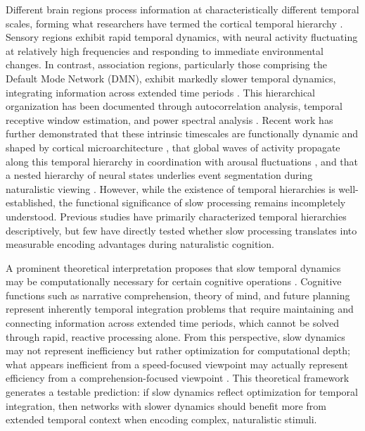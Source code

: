 \documentclass[10pt,letterpaper]{article}
\begin{document}
Different brain regions process information at characteristically different temporal scales, forming what researchers have termed the cortical temporal hierarchy \citep{murray2014hierarchy, hasson2008hierarchy}. Sensory regions exhibit rapid temporal dynamics, with neural activity fluctuating at relatively high frequencies and responding to immediate environmental changes. In contrast, association regions, particularly those comprising the Default Mode Network (DMN), exhibit markedly slower temporal dynamics, integrating information across extended time periods \citep{honey2012slow, lerner2011topographic}. This hierarchical organization has been documented through autocorrelation analysis, temporal receptive window estimation, and power spectral analysis \citep{chaudhuri2015large, gao2020neuronal}. Recent work has further demonstrated that these intrinsic timescales are functionally dynamic and shaped by cortical microarchitecture \citep{gao2020neuronal}, that global waves of activity propagate along this temporal hierarchy in coordination with arousal fluctuations \citep{raut2021global}, and that a nested hierarchy of neural states underlies event segmentation during naturalistic viewing \citep{geerligs2022nested, lugtmeijer2025temporal}. However, while the existence of temporal hierarchies is well-established, the functional significance of slow processing remains incompletely understood. Previous studies have primarily characterized temporal hierarchies descriptively, but few have directly tested whether slow processing translates into measurable encoding advantages during naturalistic cognition.

A prominent theoretical interpretation proposes that slow temporal dynamics may be computationally necessary for certain cognitive operations \citep{kiebel2008hierarchy, hasson2015hierarchical}. Cognitive functions such as narrative comprehension, theory of mind, and future planning represent inherently temporal integration problems that require maintaining and connecting information across extended time periods, which cannot be solved through rapid, reactive processing alone. From this perspective, slow dynamics may not represent inefficiency but rather optimization for computational depth; what appears inefficient from a speed-focused viewpoint may actually represent efficiency from a comprehension-focused viewpoint \citep{chen2017shared}. This theoretical framework generates a testable prediction: if slow dynamics reflect optimization for temporal integration, then networks with slower dynamics should benefit more from extended temporal context when encoding complex, naturalistic stimuli.
\end{document}
